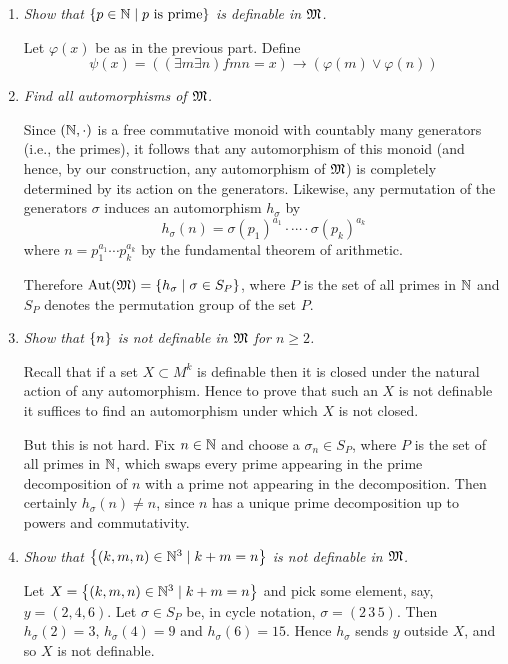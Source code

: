 \documentclass[10pt]{article}
\begin{document}
\begin{enumerate}
\begin{enumerate}
\item \emph{Show that $\left\{ p \in \mathbb{N} \mid p \mbox{ is prime} \right\}$ is definable in $\mathfrak{M}$.}

Let $\varphi(x)$ be as in the previous part.  Define $$\psi(x) = ((\exists m \exists n) fmn = x) \to (\varphi(m) \lor \varphi(n))$$

\item \emph{Find all automorphisms of $\mathfrak{M}$.}

Since $(\mathbb{N}, \cdot)$ is a free commutative monoid with countably many generators (i.e., the primes), it follows that any automorphism of this monoid (and hence, by our construction, any automorphism of $\mathfrak{M}$) is completely determined by its action on the generators.  Likewise, any permutation of the generators $\sigma$ induces an automorphism $h_\sigma$ by
\[
h_\sigma(n) = \sigma(p_1)^{a_1} \cdot \cdots \cdot \sigma(p_k)^{a_k}
\] 
where $n = p_1^{a_1} \cdots p_k^{a_k}$ by the fundamental theorem of arithmetic.

Therefore $\operatorname{Aut}(\mathfrak{M}) = \left\{ h_\sigma \mid \sigma \in S_P \right\}$, where $P$ is the set of all primes in $\mathbb{N}$ and $S_P$ denotes the permutation group of the set $P$. 

\item \emph{Show that $\left\{ n \right\}$ is not definable in $\mathfrak{M}$ for $n \geq 2$.}

Recall that if a set $X \subset M^k$ is definable then it is closed under the natural action of any automorphism.  Hence to prove that such an $X$ is not definable it suffices to find an automorphism under which $X$ is not closed.

But this is not hard.  Fix $n \in \mathbb{N}$ and choose a $\sigma_n \in S_P$, where $P$ is the set of all primes in $\mathbb{N}$, which swaps every prime appearing in the prime decomposition of $n$ with a prime not appearing in the decomposition.  Then certainly $h_\sigma(n) \neq n$, since $n$ has a unique prime decomposition up to powers and commutativity.

\item \emph{Show that $\left\{ (k,m,n) \in \mathbb{N}^3 \mid k+m = n \right\}$ is not definable in $\mathfrak{M}$.}

Let $X = \left\{ (k,m,n) \in \mathbb{N}^3 \mid k+m = n \right\}$ and pick some element, say, $y = (2,4,6)$.  Let $\sigma \in S_P$ be, in cycle notation, $\sigma = (2\,3\,5)$.  Then $h_\sigma(2) = 3$, $h_\sigma(4) = 9$ and $h_\sigma(6) = 15$.  Hence $h_\sigma$ sends $y$ outside $X$, and so $X$ is not definable.

\end{enumerate}


\end{enumerate}
\end{document}

